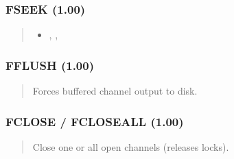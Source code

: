 \documentclass[letterpaper,10pt,english]{sphinxmanual}
\begin{document}
\subsubsection{FSEEK (1.00)}
\label{\detokenize{ppl:fseek-1-00}}\begin{quote}

\sphinxAtStartPar
{}
\begin{description}
\begin{itemize}
\item {} 
\sphinxAtStartPar
{} \textendash{} , , 

\end{itemize}

\end{description}
\end{quote}


\subsubsection{FFLUSH (1.00)}
\label{\detokenize{ppl:fflush-1-00}}\begin{quote}

\sphinxAtStartPar
{}
\begin{description}
\sphinxAtStartPar
Forces buffered channel output to disk.

\end{description}
\end{quote}


\subsubsection{FCLOSE / FCLOSEALL (1.00)}
\label{\detokenize{ppl:fclose-fcloseall-1-00}}\begin{quote}

\sphinxAtStartPar
{}
\begin{description}
\sphinxAtStartPar
Close one or all open channels (releases locks).

\end{description}
\end{quote}
\end{document}
